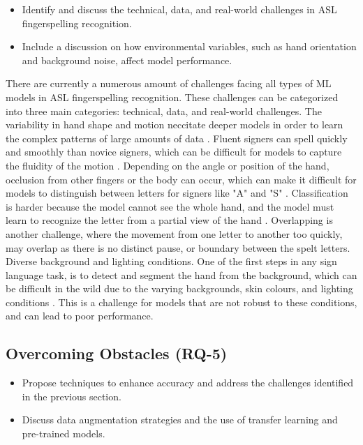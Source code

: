\begin{itemize}
    \item Identify and discuss the technical, data, and real-world challenges in ASL fingerspelling recognition.
    \item Include a discussion on how environmental variables, such as hand orientation and background noise, affect model performance.
\end{itemize}

There are currently a numerous amount of challenges facing all types of ML models in ASL fingerspelling recognition. These challenges can be categorized into three main categories: technical, data, and real-world challenges. The variability in hand shape and motion neccitate deeper models in order to learn the complex patterns of large amounts of data \cite{gajurelFineGrainedVisualAttention2021}.
Fluent signers can spell quickly and smoothly than novice signers, which can be difficult for models to capture the fluidity of the motion \cite{gajurelFineGrainedVisualAttention2021}.
Depending on the angle or position of the hand, occlusion from other fingers or the body can occur, which can make it difficult for models to distinguish between letters for signers like "A" and "S" \cite{shiAmericanSignLanguage2018}. Classification is harder because the model cannot see the whole hand, and the model must learn to recognize the letter from a partial view of the hand \cite{shiAmericanSignLanguage2018}. Overlapping is another challenge, where the movement from one letter to another too quickly, may overlap as there is no distinct pause, or boundary between the spelt letters.
Diverse background and lighting conditions.
One of the first steps in any sign language task, is to detect and segment the hand from the background, which can be difficult in the wild due to the varying backgrounds, skin colours, and lighting conditions \cite{shiFingerspellingRecognitionWild2019}. This is a challenge for models that are not robust to these conditions, and can lead to poor performance.

\subsection{Overcoming Obstacles (RQ-5)}

\begin{itemize}
    \item Propose techniques to enhance accuracy and address the challenges identified in the previous section.
    \item Discuss data augmentation strategies and the use of transfer learning and pre-trained models.
\end{itemize}

